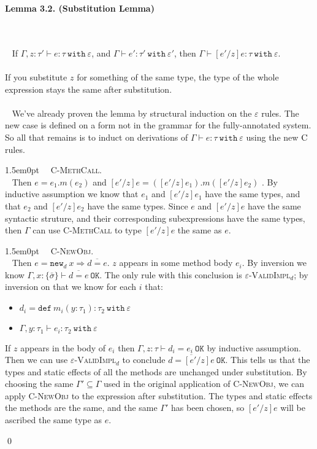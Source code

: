 \documentclass{llncs}
\newcommand{\keywadj}[1]{\mathtt{#1}}
\newcommand{\keyw}[1]{\keywadj{#1}~}
\newcommand{\thm}[3]{
	\begin{large}
		\bf{#1}
	\end{large} \\\\
	\fbox{Statement.} ~ #2
	\fbox{Proof.}~ #3 \qed
}
\newcommand{\proofcase}[2]{
	\begin{adjustwidth}{1.5em}{0pt}
		\fbox{Case.}~~#1. \\ ~#2
	\end{adjustwidth}
}
\newcommand{\type}[2]{
	#1~\keyw{with} #2
}
\newcommand{\newd}[0]{
	\keywadj{new}_d~x \Rightarrow \overline{d = e}
}
\begin{document}
\thm{Lemma 3.2. (Substitution Lemma)}
{If $\Gamma, z : \tau' \vdash e : \tau~\keyw{with} \varepsilon$, and $\Gamma \vdash e' : \tau'~\keyw{with} \varepsilon'$, then $\Gamma \vdash [e'/z]e : \tau~\keyw{with} \varepsilon$. \\\\
\fbox{Intuition} If you substitute $z$ for something of the same type, the type of the whole expression stays the same after substitution.
\\\\}
{We've already proven the lemma by structural induction on the $\varepsilon$ rules. The new case is defined on a form not in the grammar for the fully-annotated system. So all that remains is to induct on derivations of $\Gamma \vdash e : \type{\tau}{\varepsilon}$ using the new $\textsc{C}$ rules.\\

	\proofcase{\textsc{C-MethCall}}{
Then $e = e_1.m(e_2)$ and $[e'/z]e = ([e'/z]e_1).m([e'/z]e_2)$ . By inductive assumption we know that $e_1$ and $[e'/z]e_1$ have the same types, and that $e_2$ and $[e'/z]e_2$ have the same types. Since $e$ and $[e'/z]e$ have the same syntactic struture, and their corresponding subexpressions have the same types, then $\Gamma$ can use \textsc{C-MethCall} to type $[e'/z]e$ the same as $e$.\\
}

	\proofcase{\textsc{C-NewObj}}{
		Then $e = \newd$. $z$ appears in some method body $e_i$. By inversion we know $\Gamma, x : \{ \bar \sigma \} \vdash \overline {d = e}~\keywadj{OK}$. The only rule with this conclusion is \textsc{$\varepsilon$-ValidImpl$_d$}; by inversion on that we know for each $i$ that:
		 \begin{itemize}
		 	\item $d_i = \keyw{def} m_i(y : \tau_1) : \tau_2~\keyw{with} \varepsilon$
		 	\item $\Gamma, y : \tau_1 \vdash e_i : \tau_2~\keyw{with} \varepsilon$
		\end{itemize}

\noindent
If $z$ appears in the body of $e_i$ then $\Gamma, z : \tau \vdash d_i = e_i~\keywadj{OK}$ by inductive assumption. Then we can use \textsc{$\varepsilon$-ValidImpl$_d$} to conclude $\overline{d = [e'/z]e}~\keywadj{OK}$. This tells us that the types and static effects of all the methods are unchanged under substitution. By choosing the same $\Gamma' \subseteq \Gamma$ used in the original application of \textsc{C-NewObj}, we can apply \textsc{C-NewObj} to the expression after substitution. The types and static effects the methods are the same, and the same $\Gamma'$ has been chosen, so $[e'/z]e$ will be ascribed the same type as $e$.
}
}
\end{document}
